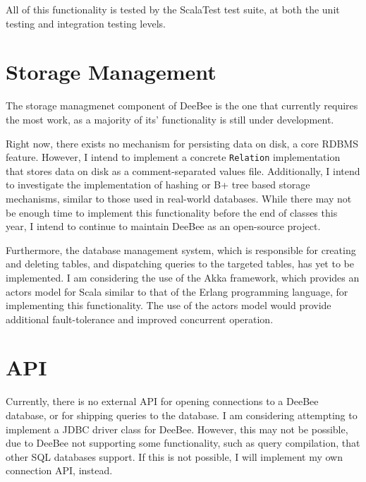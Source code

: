 All of this functionality is tested by the ScalaTest test suite, at both the unit testing and integration testing levels.

\section{Storage Management}

The storage managmenet component of DeeBee is the one that currently requires the most work, as a majority of its' functionality is still under development. 

Right now, there exists no mechanism for persisting data on disk, a core RDBMS feature. However, I intend to implement a concrete \texttt{Relation} implementation that stores data on disk as a comment-separated values file. Additionally, I intend to investigate the implementation of hashing or B+ tree based storage mechanisms, similar to those used in real-world databases. While there may not be enough time to implement this functionality before the end of classes this year, I intend to continue to maintain DeeBee as an open-source project.

Furthermore, the database management system, which is responsible for creating and deleting tables, and dispatching queries to the targeted tables, has yet to be implemented. I am considering the use of the Akka framework, which provides an actors model for Scala similar to that of the Erlang programming language, for implementing this functionality. The use of the actors model would provide additional fault-tolerance and improved concurrent operation.

\section{API}

Currently, there is no external API for opening connections to a DeeBee database, or for shipping queries to the database. I am considering attempting to implement a JDBC driver class for DeeBee. However, this may not be possible, due to DeeBee not supporting some functionality, such as query compilation, that other SQL databases support. If this is not possible, I will implement my own connection API, instead.

\pagebreak
{}


